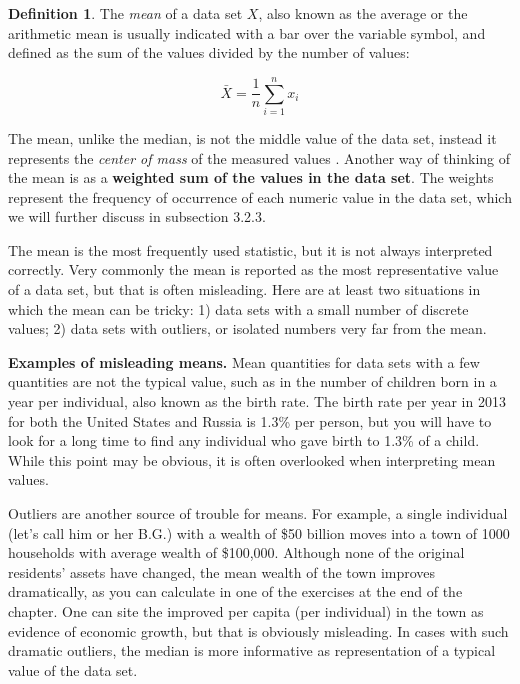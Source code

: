 \documentclass[
]{book}
\theoremstyle{definition}
\newtheorem{definition}{Definition}[chapter]
\theoremstyle{definition}
\theoremstyle{definition}
\theoremstyle{remark}
\begin{document}
\begin{definition}
\protect\hypertarget{def:def-mean}{}{\label{def:def-mean} }The \emph{mean} of a data set \(X\), also known as the average or the arithmetic mean is usually indicated with a bar over the variable symbol, and defined as the sum of the values divided by the number of values:
\end{definition}
\begin{equation}
  \bar X  = \frac{1}{n} \sum_{i=1}^n x_i 
\label{eq:ch3_mean_def}
\end{equation}

The mean, unlike the median, is not the middle value of the data set, instead it represents the \emph{center of mass} of the measured values \citep{whitlock_analysis_2008}. Another way of thinking of the mean is as a \textbf{weighted sum of the values in the data set}. The weights represent the frequency of occurrence of each numeric value in the data set, which we will further discuss in subsection 3.2.3.

The mean is the most frequently used statistic, but it is not always interpreted correctly. Very commonly the mean is reported as the most representative value of a data set, but that is often misleading. Here are at least two situations in which the mean can be tricky: 1) data sets with a small number of discrete values; 2) data sets with outliers, or isolated numbers very far from the mean.

\textbf{Examples of misleading means.} Mean quantities for data sets with a few quantities are not the typical value, such as in the number of children born in a year per individual, also known as the birth rate. The birth rate per year in 2013 for both the United States and Russia is 1.3\% per person, but you will have to look for a long time to find any individual who gave birth to 1.3\% of a child. While this point may be obvious, it is often overlooked when interpreting mean values.

Outliers are another source of trouble for means. For example, a single individual (let's call him or her B.G.) with a wealth of \$50 billion moves into a town of 1000 households with average wealth of \$100,000. Although none of the original residents' assets have changed, the mean wealth of the town improves dramatically, as you can calculate in one of the exercises at the end of the chapter. One can site the improved per capita (per individual) in the town as evidence of economic growth, but that is obviously misleading. In cases with such dramatic outliers, the median is more informative as representation of a typical value of the data set.
\end{document}
